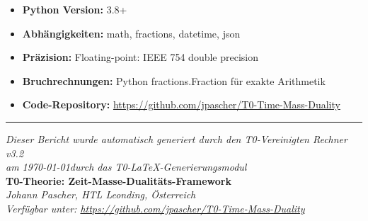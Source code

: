 \documentclass[11pt,a4paper]{article}
\begin{document}
	\begin{itemize}
		\item \textbf{Python Version:} 3.8+
		\item \textbf{Abhängigkeiten:} math, fractions, datetime, json
		\item \textbf{Präzision:} Floating-point: IEEE 754 double precision
		\item \textbf{Bruchrechnungen:} Python fractions.Fraction für exakte Arithmetik
		\item \textbf{Code-Repository:} \url{https://github.com/jpascher/T0-Time-Mass-Duality}
	\end{itemize}
	
	\vfill
	
	\begin{center}
		\hrule
		\vspace{0.5cm}
		\textit{Dieser Bericht wurde automatisch generiert durch den T0-Vereinigten Rechner v3.2}\\
		\textit{am \today\space durch das T0-LaTeX-Generierungsmodul}\\
		\vspace{0.3cm}
		\textbf{T0-Theorie: Zeit-Masse-Dualitäts-Framework}\\
		\textit{Johann Pascher, HTL Leonding, Österreich}\\
		\textit{Verfügbar unter: \url{https://github.com/jpascher/T0-Time-Mass-Duality}}
	\end{center}
	
\end{document}
